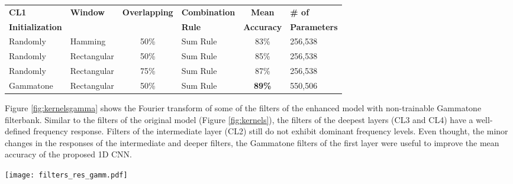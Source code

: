 \documentclass[preprint,final,12pt]{elsarticle}
\begin{document}
\begin{table*}[htpb!]
\caption{Improvements in the mean accuracy for the 16,000-input 1D CNN on the UrbanSound8k dataset.} \centering \footnotesize
\begin{tabular}{l l c l c l}
\hline\hline \textbf{CL1} & \textbf{Window} & \textbf{Overlapping} & \textbf{Combination} & \textbf{Mean} & \textbf{\# of }  \\
\textbf{Initialization} &  &  & \textbf{Rule} & \textbf{Accuracy} & \textbf{Parameters} \\ \hline
Randomly  & Hamming            & 50\%                      & Sum Rule                                & 83\% & 256,538          \\
Randomly & Rectangular              & 50\%                      & Sum Rule                                & 85\% & 256,538          \\
Randomly & Rectangular              & 75\%                      & Sum Rule                                & 87\% &  256,538         \\
Gammatone  & Rectangular             & 50\%                      & Sum Rule                                & \textbf{89\%} &  550,506        \\ \hline
\end{tabular}
\label{table:acc_gamm_org}
\end{table*}


Figure \ref{fig:kernelsgamma} shows the Fourier transform of some of the filters of the enhanced model with non-trainable Gammatone filterbank. Similar to the filters of the original model (Figure \ref{fig:kernels}), the filters of the deepest layers (CL3 and CL4) have a well-defined frequency response. Filters of the intermediate layer (CL2) still do not exhibit dominant frequency levels. Even thought, the minor changes in the responses of the intermediate and deeper filters, the Gammatone filters of the first layer were useful to improve the mean accuracy of the proposed 1D CNN.   



\begin{figure*}[htpb!]
  \centering
  \texttt{[image: filters\_res\_gamm.pdf]}
  \caption{Fourier transform of randomly selected filters from the four convolutional layers (CLs) of the 16,000-input 1D CNN with Gammatone filterbank in the first convolutional layer of the network.}
  \label{fig:kernelsgamma}
\end{figure*}
\end{document}

